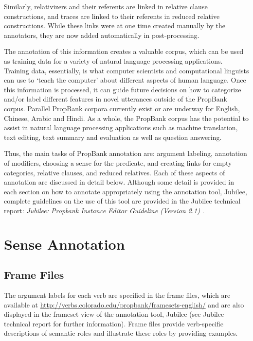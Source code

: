 \documentclass[11pt]{report}
\begin{document}
Similarly, relativizers and their referents are linked in relative clause constructions, and traces are linked to their referents in reduced relative constructions.  While these links were at one time created manually by the annotators, they are now added automatically in post-processing.  

The annotation of this information creates a valuable corpus, which can be used as training data for a variety of natural language processing applications.  Training data, essentially, is what computer scientists and computational linguists can use to `teach the computer' about different aspects of human language.  Once this information is processed, it can guide future decisions on how to categorize and/or label different features in novel utterances outside of the PropBank corpus.  Parallel PropBank corpora currently exist or are underway for English, Chinese, Arabic and Hindi.   As a whole, the PropBank corpus has the potential to assist in natural language processing applications such as machine translation, text editing, text summary and evaluation as well as question answering.  
 
 Thus, the main tasks of PropBank annotation are: argument labeling, annotation of modifiers, choosing a sense for the predicate, and creating links for empty categories, relative clauses, and reduced relatives.  Each of these aspects of annotation are discussed in detail below.  Although some detail is provided in each section on how to annotate appropriately using the annotation tool, Jubilee, complete guidelines on the use of this tool are provided in  the Jubilee technical report: \textit{Jubilee: Propbank Instance Editor Guideline (Version 2.1)} \cite{choi-09b}.
 
\section{Sense Annotation}
\subsection{Frame Files}
The argument labels for each verb are specified in the frame files, which are available at \url{http://verbs.colorado.edu/propbank/framesets-english/} and are also displayed in the frameset view of the annotation tool, Jubilee (see Jubilee technical report \cite{choi-09b} for further information).  Frame files provide verb-specific descriptions of semantic roles and illustrate these roles by providing examples. 
\end{document}
